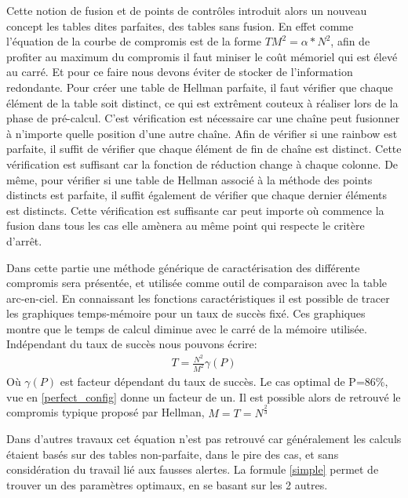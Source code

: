 
	Cette notion de fusion et de points de contrôles introduit alors un nouveau concept les tables dites parfaites, des tables sans fusion. En effet comme l'équation de la courbe de compromis est de la forme $TM^2=\alpha *N^2$, afin de profiter au maximum du compromis il faut miniser le coût mémoriel qui est élevé au carré. Et pour ce faire nous devons éviter de stocker de l'information redondante.
	\bigskip
	Pour créer une table de Hellman parfaite, il faut vérifier que chaque élément de la table soit distinct, ce qui est extrêment couteux à réaliser lors de la phase de pré-calcul. C'est vérification est nécessaire car une chaîne peut fusionner à n'importe quelle position d'une autre chaîne.
	\bigskip
	Afin de vérifier si une \gls{rainbow} est parfaite, il suffit de vérifier que chaque élément de fin de chaîne est distinct. Cette vérification est suffisant car la fonction de réduction change à chaque colonne.
	\bigskip
	De même, pour vérifier si une table de Hellman associé à la méthode des points distincts est parfaite, il suffit également de vérifier que chaque dernier éléments est distincts. Cette vérification est suffisante car peut importe où commence la fusion dans tous les cas elle amènera au même point qui respecte le critère d'arrêt.

	Dans cette partie une méthode générique de caractérisation des différente compromis sera présentée, et utilisée comme outil de comparaison avec la table arc-en-ciel.
	En connaissant les fonctions caractéristiques il est possible de tracer les graphiques temps-mémoire pour un taux de succès fixé. Ces graphiques montre que le temps de calcul diminue avec le carré de la mémoire utilisée.
	Indépendant du taux de succès nous pouvons écrire:
\begin{align*}\label{simple}
	T=\frac{N^2}{M^2}\gamma(P)
\end{align*}
	Où $\gamma(P)$ est facteur dépendant du taux de succès. Le cas optimal de P=86\%, vue en \ref{perfect_config} donne un facteur de un. Il est possible alors de retrouvé le compromis typique proposé par Hellman, $M=T=N^{\frac{2}{3}}$
	
	\bigskip

	Dans d'autres travaux cet équation n'est pas retrouvé car généralement les calculs étaient basés sur des tables non-parfaite, dans le pire des cas, et sans considération du travail lié aux fausses alertes. La formule \ref{simple} permet de trouver un des paramètres optimaux, en se basant sur les 2 autres.

